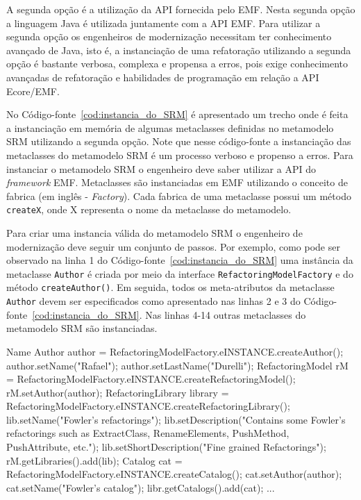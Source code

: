 A segunda opção é a utilização da API fornecida pelo EMF. Nesta segunda opção a linguagem Java é utilizada juntamente com a API EMF. Para utilizar a segunda opção os engenheiros de modernização necessitam ter conhecimento avançado de Java, isto é, a instanciação de uma refatoração utilizando a segunda opção é bastante verbosa, complexa e propensa a erros, pois exige conhecimento avançadas de refatoração e habilidades de programação em relação a API Ecore/EMF. 

No Código-fonte~\ref{cod:instancia_do_SRM} é apresentado um trecho onde é feita a instanciação em memória de algumas metaclasses definidas no metamodelo SRM utilizando a segunda opção. Note que nesse código-fonte a instanciação das metaclasses do metamodelo SRM é um processo verboso e propenso a erros. Para instanciar o metamodelo SRM o engenheiro deve saber utilizar a API do \textit{framework} EMF. Metaclasses são instanciadas em EMF utilizando o conceito de fabrica (em inglês - \textit{Factory}). Cada fabrica de uma metaclasse possui um método \texttt{createX}, onde X representa o nome da metaclasse do metamodelo. 

Para criar uma instancia válida do metamodelo SRM o engenheiro de modernização deve seguir um conjunto de passos. Por exemplo, como pode ser observado na linha 1 do Código-fonte~\ref{cod:instancia_do_SRM} uma instância da metaclasse \texttt{Author} é criada por meio da interface \texttt{RefactoringModelFactory} e do método \texttt{createAuthor()}. Em seguida, todos os meta-atributos da metaclasse \texttt{Author} devem ser especificados como apresentado nas linhas 2 e 3 do Código-fonte~\ref{cod:instancia_do_SRM}. Nas linhas 4-14 outras metaclasses do metamodelo SRM são instanciadas. 

\begin{codigo}[caption={[Instanciação do metamodelo SRM programaticamente.] Instanciação do metamodelo SRM.},escapeinside={(*@}{@*)}, basicstyle=\footnotesize, label={cod:instancia_do_SRM}, language=Java]{Name}
Author author = RefactoringModelFactory.eINSTANCE.createAuthor();
author.setName("Rafael");
author.setLastName("Durelli");
RefactoringModel rM = RefactoringModelFactory.eINSTANCE.createRefactoringModel();
rM.setAuthor(author);
RefactoringLibrary library = RefactoringModelFactory.eINSTANCE.createRefactoringLibrary();
lib.setName("Fowler's refactorings");
lib.setDescription("Contains some Fowler's refactorings such as ExtractClass, RenameElements, PushMethod, PushAttribute, etc.");
lib.setShortDescription("Fine grained Refactorings");
rM.getLibraries().add(lib);
Catalog cat = RefactoringModelFactory.eINSTANCE.createCatalog();
cat.setAuthor(author);
cat.setName("Fowler's catalog");
libr.getCatalogs().add(cat);
...
\end{codigo}

